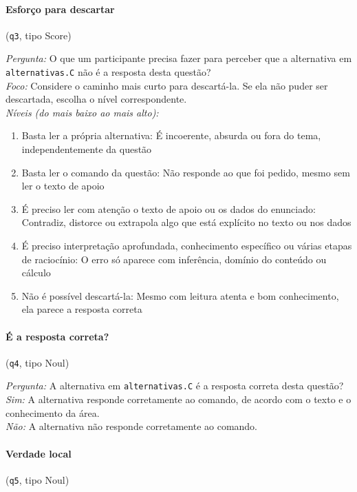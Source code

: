 \paragraph{Esforço para descartar} (\texttt{q3}, tipo Score)

\textit{Pergunta:} O que um participante precisa fazer para perceber que a alternativa em \texttt{alternativas.C} não é a resposta desta questão?\\
\textit{Foco:} Considere o caminho mais curto para descartá-la. Se ela não puder ser descartada, escolha o nível correspondente.\\
\textit{Níveis (do mais baixo ao mais alto):}
\begin{enumerate}[nosep,label=\arabic*.,start=0]
  \item Basta ler a própria alternativa: É incoerente, absurda ou fora do tema, independentemente da questão
  \item Basta ler o comando da questão: Não responde ao que foi pedido, mesmo sem ler o texto de apoio
  \item É preciso ler com atenção o texto de apoio ou os dados do enunciado: Contradiz, distorce ou extrapola algo que está explícito no texto ou nos dados
  \item É preciso interpretação aprofundada, conhecimento específico ou várias etapas de raciocínio: O erro só aparece com inferência, domínio do conteúdo ou cálculo
  \item Não é possível descartá-la: Mesmo com leitura atenta e bom conhecimento, ela parece a resposta correta
\end{enumerate}

\paragraph{É a resposta correta?} (\texttt{q4}, tipo Noul)

\textit{Pergunta:} A alternativa em \texttt{alternativas.C} é a resposta correta desta questão?\\
\textit{Sim:} A alternativa responde corretamente ao comando, de acordo com o texto e o conhecimento da área.\\
\textit{Não:} A alternativa não responde corretamente ao comando.

\paragraph{Verdade local} (\texttt{q5}, tipo Noul)

